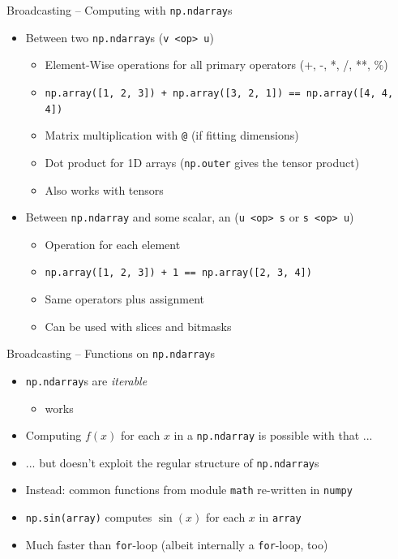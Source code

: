\begin{frame}[fragile]{Broadcasting -- Computing with \texttt{np.ndarray}s}
%
\begin{itemize}
\item Between two \texttt{np.ndarray}s (\texttt{v <op> u})
	\begin{itemize}
	\item Element-Wise operations for all primary operators (+, -, *, /, **, \%)
	\item \texttt{np.array([1, 2, 3]) + np.array([3, 2, 1]) == np.array([4, 4, 4])}
	\item Matrix multiplication with \texttt{@} (if fitting dimensions)
	\item Dot product for 1D arrays (\texttt{np.outer} gives the tensor product)
	\item Also works with tensors
	\end{itemize}
\item Between \texttt{np.ndarray} and some scalar, \eg an  (\texttt{u <op> s} or \texttt{s <op> u})
	\begin{itemize}
	\item Operation for each element
	\item \texttt{np.array([1, 2, 3]) + 1 == np.array([2, 3, 4])}
	\item Same operators plus assignment
	\item Can be used with slices and bitmasks
	\end{itemize}
\end{itemize}
%
\end{frame}


\begin{frame}[fragile]{Broadcasting -- Functions on \texttt{np.ndarray}s}
%
\begin{itemize}
\item \texttt{np.ndarray}s are \emph{iterable}
	\begin{itemize}
	\item {} works
	\end{itemize}
\item Computing $f(x)$ for each $x$ in a \texttt{np.ndarray} is possible with that ...
\item ... but doesn't exploit the regular structure of \texttt{np.ndarray}s
\item Instead: common functions from module \texttt{math} re-written in \texttt{numpy}
\item \texttt{np.sin(array)} computes $\sin(x)$ for each $x$ in \texttt{array}
\item Much faster than \texttt{for}-loop (albeit internally a \texttt{for}-loop, too)
\end{itemize}
%
\end{frame}

